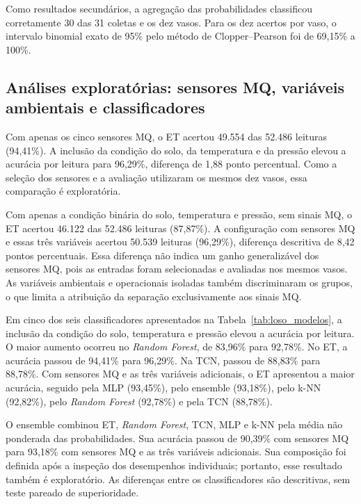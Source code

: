 Como resultados secundários, a agregação das probabilidades classificou corretamente 30 das 31 coletas e os dez vasos. Para os dez acertos por vaso, o intervalo binomial exato de 95\% pelo método de Clopper--Pearson foi de 69,15\% a 100\%.

\subsection{Análises exploratórias: sensores MQ, variáveis ambientais e classificadores}
\label{subsec:res_mq}

Com apenas os cinco sensores MQ, o ET acertou 49.554 das 52.486 leituras (94,41\%). A inclusão da condição do solo, da temperatura e da pressão elevou a acurácia por leitura para 96,29\%, diferença de 1,88 ponto percentual. Como a seleção dos sensores e a avaliação utilizaram os mesmos dez vasos, essa comparação é exploratória.

Com apenas a condição binária do solo, temperatura e pressão, sem sinais MQ, o ET acertou 46.122 das 52.486 leituras (87,87\%). A configuração com sensores MQ e essas três variáveis acertou 50.539 leituras (96,29\%), diferença descritiva de 8,42 pontos percentuais. Essa diferença não indica um ganho generalizável dos sensores MQ, pois as entradas foram selecionadas e avaliadas nos mesmos vasos. As variáveis ambientais e operacionais isoladas também discriminaram os grupos, o que limita a atribuição da separação exclusivamente aos sinais MQ.

Em cinco dos seis classificadores apresentados na Tabela~\ref{tab:loso_modelos}, a inclusão da condição do solo, temperatura e pressão elevou a acurácia por leitura. O maior aumento ocorreu no \textit{Random Forest}, de 83,96\% para 92,78\%. No ET, a acurácia passou de 94,41\% para 96,29\%. Na TCN, passou de 88,83\% para 88,78\%. Com sensores MQ e as três variáveis adicionais, o ET apresentou a maior acurácia, seguido pela MLP (93,45\%), pelo ensemble (93,18\%), pelo k-NN (92,82\%), pelo \textit{Random Forest} (92,78\%) e pela TCN (88,78\%).

O ensemble combinou ET, \textit{Random Forest}, TCN, MLP e k-NN pela média não ponderada das probabilidades. Sua acurácia passou de 90,39\% com sensores MQ para 93,18\% com sensores MQ e as três variáveis adicionais. Sua composição foi definida após a inspeção dos desempenhos individuais; portanto, esse resultado também é exploratório. As diferenças entre os classificadores são descritivas, sem teste pareado de superioridade.

